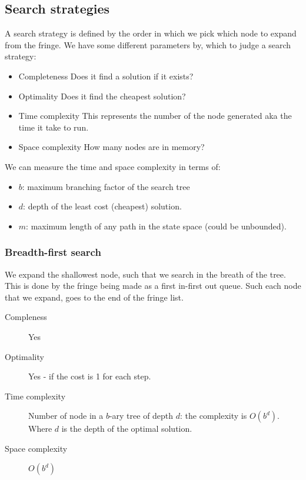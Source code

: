 \documentclass{article}
\begin{document}
\subsection{Search strategies}%
\label{ssub:search_strategies}

A search strategy is defined by the order in which we pick which node to expand
from the fringe. We have some different parameters by, which to judge a search
strategy:
\begin{itemize}[noitemsep]
  \item Completeness
    \subitem Does it find a solution if it exists?
  \item Optimality
    \subitem Does it find the cheapest solution?
  \item Time complexity
    \subitem This represents the number of the node generated aka the time it
    take to run.
  \item Space complexity
    \subitem How many nodes are in memory?
\end{itemize}
We can measure the time and space complexity in terms of:
\begin{itemize}
  \item $b$: maximum branching factor of the search tree
  \item $d$: depth of the least cost (cheapest) solution.
  \item $m$: maximum length of any path in the state space (could be unbounded).
\end{itemize}

\subsubsection{Breadth-first search}%
\label{par:breadth_first_search}
We expand the shallowest node, such that we search in the breath of the tree.
This is done by the fringe being made as a first in-first out queue. Such each
node that we expand, goes to the end of the fringe list.

\begin{description}
  \item[Compleness] Yes
  \item[Optimality] Yes - if the cost is 1 for each step.
  \item[Time complexity] Number of node in a $b$-ary tree of depth $d$: the
    complexity is $O(b^d)$. Where $d$ is the depth of the optimal solution.
  \item[Space complexity] $O(b^d)$
\end{description}
\end{document}
